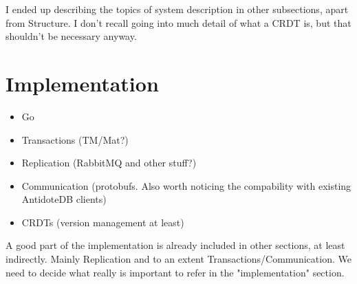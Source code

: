 \documentclass{vldb}
\newcommand{\grumbler}[2]{{\color{red}{\bf #1:} #2}}
\newcommand{\andre}[1]{\grumbler{andre}{#1}}
\begin{document}
\andre{I ended up describing the topics of system description in other subsections, apart from Structure. I don't recall going into much detail of what a CRDT is, but that shouldn't be necessary anyway.}

\section{Implementation}

\begin{itemize}
	\item Go
	\item Transactions (TM/Mat?)
	\item Replication (RabbitMQ and other stuff?)
	\item Communication (protobufs. Also worth noticing the compability with existing AntidoteDB clients)
	\item CRDTs (version management at least)
\end{itemize}

\andre{A good part of the implementation is already included in other sections, at least indirectly. Mainly Replication and to an extent Transactions/Communication. We need to decide what really is important to refer in the "implementation" section.}
\end{document}
